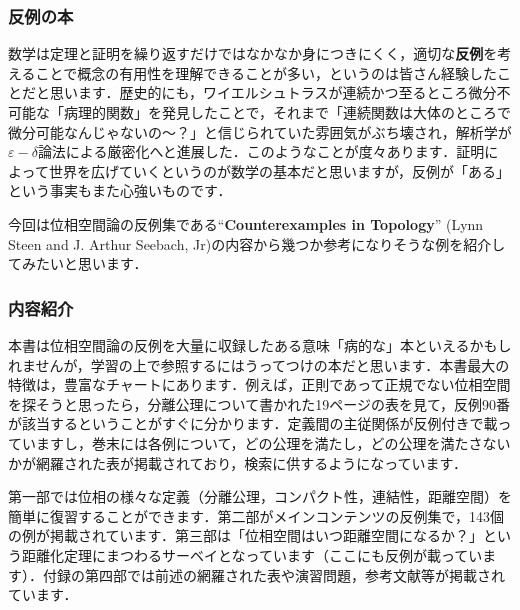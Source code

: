 \subsubsection*{反例の本}
数学は定理と証明を繰り返すだけではなかなか身につきにくく，適切な{\bf 反例}を考えることで概念の有用性を理解できることが多い，というのは皆さん経験したことだと思います．歴史的にも，ワイエルシュトラスが連続かつ至るところ微分不可能な「病理的関数」を発見したことで，それまで「連続関数は大体のところで微分可能なんじゃないの〜？」と信じられていた雰囲気がぶち壊され，解析学が$\varepsilon - \delta$論法による厳密化へと進展した．このようなことが度々あります．証明によって世界を広げていくというのが数学の基本だと思いますが，反例が「ある」という事実もまた心強いものです．\par
今回は位相空間論の反例集である``\textbf{Counterexamples in Topology}''  (Lynn Steen and J. Arthur Seebach, Jr)の内容から幾つか参考になりそうな例を紹介してみたいと思います．
\subsubsection*{内容紹介}
本書は位相空間論の反例を大量に収録したある意味「病的な」本といえるかもしれませんが，学習の上で参照するにはうってつけの本だと思います．本書最大の特徴は，豊富なチャートにあります．例えば，正則であって正規でない位相空間を探そうと思ったら，分離公理について書かれた19ページの表を見て，反例90番が該当するということがすぐに分かります．定義間の主従関係が反例付きで載っていますし，巻末には各例について，どの公理を満たし，どの公理を満たさないかが網羅された表が掲載されており，検索に供するようになっています．\par
第一部では位相の様々な定義（分離公理，コンパクト性，連結性，距離空間）を簡単に復習することができます．第二部がメインコンテンツの反例集で，143個の例が掲載されています．第三部は「位相空間はいつ距離空間になるか？」という距離化定理にまつわるサーベイとなっています（ここにも反例が載っています）．付録の第四部では前述の網羅された表や演習問題，参考文献等が掲載されています．


